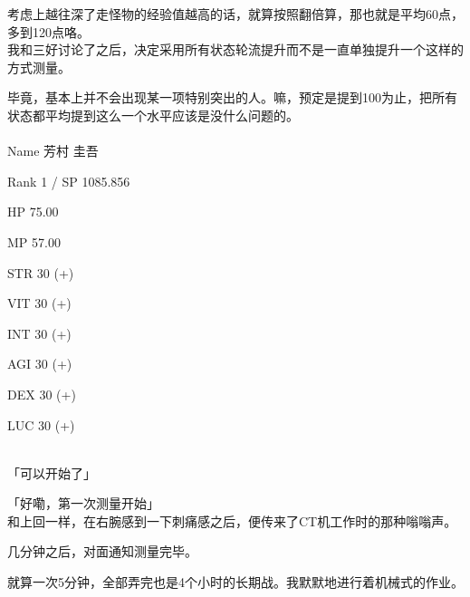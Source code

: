 考虑上越往深了走怪物的经验值越高的话，就算按照翻倍算，那也就是平均60点，多到120点咯。\\

我和三好讨论了之后，决定采用所有状态轮流提升而不是一直单独提升一个这样的方式测量。

毕竟，基本上并不会出现某一项特别突出的人。嘛，预定是提到100为止，把所有状态都平均提到这么一个水平应该是没什么问题的。\\

\cardline\\

  Name 芳村 圭吾

  Rank 1 / SP 1085.856

  HP  75.00

  MP  57.00

%  
 

  STR 30 (+)

  VIT 30 (+)

  INT 30 (+)

  AGI 30 (+)

  DEX 30 (+)

  LUC 30 (+)

\cardline\\

「可以开始了」

「好嘞，第一次测量开始」\\

和上回一样，在右腕感到一下刺痛感之后，便传来了CT机工作时的那种嗡嗡声。

几分钟之后，对面通知测量完毕。

就算一次5分钟，全部弄完也是4个小时的长期战。我默默地进行着机械式的作业。\\

